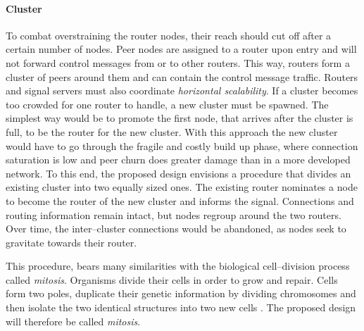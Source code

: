 \paragraph{Cluster}\label{par:scaling-cluster}
To combat overstraining the router nodes, their reach should cut off after a certain number of nodes. Peer nodes are assigned to a router upon entry and will not forward control messages from or to other routers. This way, routers form a cluster of peers around them and can contain the control message traffic. Routers and signal servers must also coordinate \textit{horizontal scalability}. If a cluster becomes too crowded for one router to handle, a new cluster must be spawned. The simplest way would be to promote the first node, that arrives after the cluster is full, to be the router for the new cluster. With this approach the new cluster would have to go through the fragile and costly build up phase, where connection saturation is low and peer churn does greater damage than in a more developed network. To this end, the proposed design envisions a procedure that divides an existing cluster into two equally sized ones. The existing router nominates a node to become the router of the new cluster and informs the signal. Connections and routing information remain intact, but nodes regroup around the two routers. Over time, the inter–cluster connections would be abandoned, as nodes seek to gravitate towards their router.

This procedure, bears many similarities with the biological cell–division process called \textit{mitosis}. Organisms divide their cells in order to grow and repair. Cells form two poles, duplicate their genetic information by dividing chromosomes and then isolate the two identical structures into two new cells \cite{mitosis-britannica}. The proposed design will therefore be called \textit{mitosis}.
